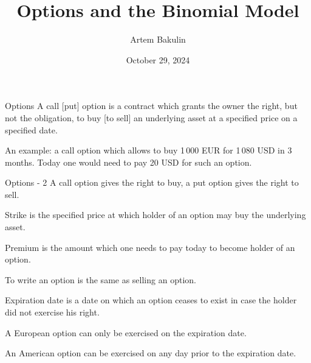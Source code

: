 \documentclass{beamer}
\title{Options and the Binomial Model}
\author{Artem Bakulin}
\date{October 29, 2024}
\begin{document}
\begin{frame}
\titlepage
\end{frame}



\begin{frame}{Options}
\justifying
A \alert{call  [put] option} is a contract which grants the owner the right, but not the obligation, to buy [to sell] an underlying asset at a specified price on a specified date.

\justify
An example: a call option which allows to buy 1\,000 EUR for 1\,080 USD in 3 months. Today one would need to pay 20 USD for such an option.
\end{frame}



\begin{frame}{Options - 2}
\justify
A \alert{call} option gives the right to buy, a \alert{put} option gives the right to sell.

\justify
\alert{Strike} is the specified price at which holder of an option may buy the underlying asset.

\justify
\alert{Premium} is the amount which one needs to pay today to become holder of an option.

\justify
To \alert{write} an option is the same as selling an option.

\justify
\alert{Expiration date} is a date on which an option ceases to exist in case the holder did not exercise his right.

\justify
A \alert{European} option can only be exercised on the expiration date.

\justify
An \alert{American} option can be exercised on any day prior to the expiration date.
\end{frame}



\newcommand{\circlewithtext}[3]{
    \node[circle, fill, inner sep = 1.5pt] at (#1, #2) {};
    \node[anchor = north] at (#1, #2) {#3};
}
\end{document}
